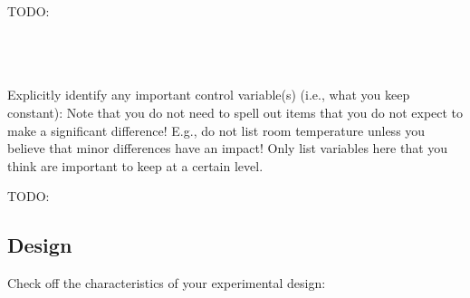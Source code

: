 \documentclass{article}
\begin{document}
\begin{minipage}{0.48\textwidth}
    \begin{tcolorbox}[title=Dependent Variable:, colback=white, colframe=black, arc=0pt, outer arc=0pt]
        TODO:
    \end{tcolorbox}
\end{minipage}%
\hfill
\begin{minipage}{0.48\textwidth}
    \begin{tcolorbox}[title=Measurement Scale, colback=white, colframe=black, arc=0pt, outer arc=0pt]
        
    \end{tcolorbox}
\end{minipage}
\\\\\\
Explicitly identify any important control variable(s) (i.e., what you keep constant): Note that you do not need to spell out items that you do not expect to make a significant difference! E.g., do not list room temperature unless you believe that minor differences have an impact! Only list variables here that you think are important to keep at a certain level.\\

\begin{minipage}{0.48\textwidth}
    \begin{tcolorbox}[title=Control Variable:, colback=white, colframe=black, arc=0pt, outer arc=0pt]
        TODO:
    \end{tcolorbox}
\end{minipage}%
\hfill
\begin{minipage}{0.48\textwidth}
    \begin{tcolorbox}[title=Fixed Value, colback=white, colframe=black, arc=0pt, outer arc=0pt]
        
    \end{tcolorbox}
\end{minipage}

\subsection{Design}
Check off the characteristics of your experimental design:\\
\end{document}
